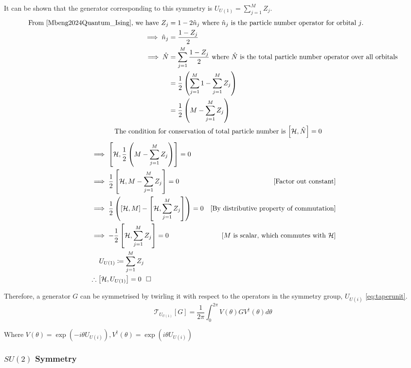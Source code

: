 \documentclass{article}
\newcommand{\qed}{\hfill\square}
\newcommand{\twirl}[2]{\mathcal{T}_{#1}\left[#2\right]}
\newcommand{\ham}{\mathcal{H}}
\begin{document}
It can be shown that the generator corresponding to this symmetry is $U_{U(1)} =\sum_{j=1}^MZ_j$.
\begin{align*}
    \text{From \cite{Mbeng2024Quantum_Ising}, we have } Z_j &= 1-2\hat{n}_j \text{ where $\hat{n}_j$ is the particle number operator for orbital $j$.}\\
    \implies \hat{n}_j &= \frac{1 - Z_j}{2}\\
    \implies \hat{N} &= \sum_{j = 1}^M \frac{1 - Z_j}{2} \text{ where $\hat{N}$ is the total particle number operator over all orbitals}\\
    &=\frac{1}{2}\left(\sum_{j=1}^{M} 1 - \sum_{j=1}^M Z_j \right)\\
    &=\frac{1}{2}\left(M - \sum_{j=1}^M Z_j \right)\\
    \text{The condition for } &\text{conservation of total particle number is $\left[\ham, \hat{N}\right] = 0$}
\end{align*}\vspace{-1.5em}
\begin{align*}
    &\implies \left[\ham, \frac{1}{2}\left(M - \sum_{j=1}^M Z_j \right)\right] = 0\\
    &\implies \frac{1}{2}\left[\ham, M - \sum_{j=1}^M Z_j \right] = 0 & \text{[Factor out constant]}\\
    &\implies \frac{1}{2}\left(\left[\ham, M\right] - \left[ \ham, \sum_{j=1}^M Z_j \right]\right) = 0 & \text{[By distributive property of commutation]}\\
    &\implies -\frac{1}{2}\left[ \ham, \sum_{j=1}^M Z_j \right] = 0 & \text{[$M$ is scalar, which commutes with $\ham$]}\\
    &~~~~U_{U(1)} \coloneq\sum_{j=1}^M Z_j&\\
    &\therefore \left[ \ham, U_{U(1)} \right] = 0~~\qed \\
\end{align*}

Therefore, a generator $G$ can be symmetrised by twirling it with respect to the operators in the symmetry group, $U_{U(i)}$ \ref{eq:taperunit}.
\begin{equation}
    \twirl{U_{U(1)}}{G} = \frac{1}{2\pi}\int_0^{2\pi} V(\theta)GV^\dagger(\theta) d\theta
\end{equation}

Where $V(\theta) = \exp(-i\theta U_{U(i)}), V^\dagger(\theta) = \exp(i\theta U_{U(i)})$

\subsubsection{$SU(2)$ Symmetry}
\end{document}
